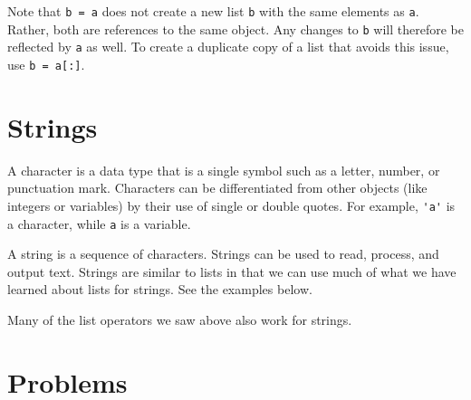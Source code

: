 \documentclass{ximera}
\begin{document}
Note that \verb|b = a| does not create a new list \verb|b| with the same elements as \verb|a|. Rather, both are references to the same object. Any changes to \verb|b| will therefore be reflected by \verb|a| as well. To create a duplicate copy of a list that avoids this issue, use \verb|b = a[:]|.

\section{Strings}

A character is a data type that is a single symbol such as a letter, number, or punctuation mark. Characters can be differentiated from other objects (like integers or variables) by their use of single or double quotes. For example, \verb|'a'| is a character, while \verb|a| is a variable.

A string is a sequence of characters. Strings can be used to read, process, and output text. Strings are similar to lists in that we can use much of what we have learned about lists for strings. See the examples below.

Many of the list operators we saw above also work for strings.



\section{Problems}

\end{document}
